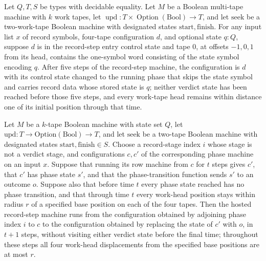 \begin{theorem}
\label{Turing.recordStep_state_run}
\leanok
{}
Let $Q,T,S$ be types with decidable equality. Let $M$ be a Boolean multi-tape machine
with $k$ work tapes, let
$\operatorname{upd}:T\times\operatorname{Option}(\mathrm{Bool})\to T$, and let
$\mathrm{seek}$ be a two-work-tape Boolean machine with designated states
$\mathrm{start},\mathrm{finish}$. For any input list $x$ of record symbols, four-tape
configuration $d$, and optional state $q:Q$, suppose $d$ is in the record-step entry
control state and tape 0, at offsets $-1,0,1$ from its head, contains the one-symbol
word consisting of the state symbol encoding $q$. After five steps of the record-step
machine, the configuration is $d$ with its control state changed to the running phase
that skips the state symbol and carries record data whose stored state is $q$; neither
verdict state has been reached before those five steps, and every work-tape head remains
within distance one of its initial position through that time.
\end{theorem}

\begin{theorem}
\label{Turing.recordStep_phase_run}
\leanok
{}
Let $M$ be a $k$-tape Boolean machine with state set $Q$, let
$\mathrm{upd}:T\to\mathrm{Option}(\mathrm{Bool})\to T$, and let $\mathrm{seek}$ be a
two-tape Boolean machine with designated states $\mathrm{start},\mathrm{finish}\in S$.
Choose a record-stage index $i$ whose stage is not a verdict stage, and configurations
$c,c'$ of the corresponding phase machine on an input $x$. Suppose that running its row
machine from $c$ for $t$ steps gives $c'$, that $c'$ has phase state $s'$, and that the
phase-transition function sends $s'$ to an outcome $o$. Suppose also that before time
$t$ every phase state reached has no phase transition, and that through time $t$ every
work-head position stays within radius $r$ of a specified base position on each of the
four tapes. Then the hosted record-step machine runs from the configuration obtained by
adjoining phase index $i$ to $c$ to the configuration obtained by replacing the state of
$c'$ with $o$, in $t+1$ steps, without visiting either verdict state before the final
time; throughout these steps all four work-head displacements from the specified base
positions are at most $r$.
\end{theorem}

